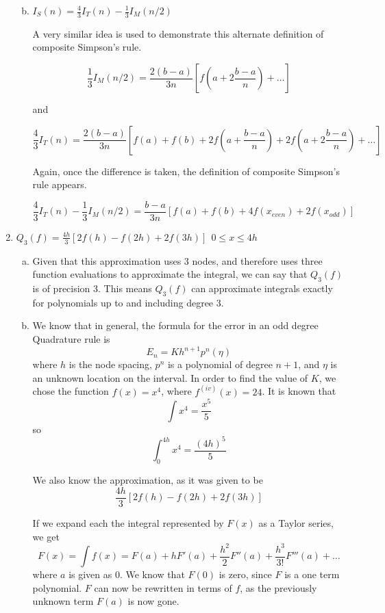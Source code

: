 \documentclass[11pt]{article}
\begin{document}
\begin{enumerate}
\begin{enumerate}[(a)]
		\medskip

		\item $I_S(n) = \frac{4}{3}I_T(n) - \frac{1}{3}I_M(n/2)$

		A very similar idea is used to demonstrate this alternate definition of composite Simpson's rule.

		\[
		\frac{1}{3}I_M(n/2) = \frac{2(b-a)}{3n}[f(a+2\frac{b-a}{n}) + \ldots]
		\]

		and

		\[
		\frac{4}{3}I_T(n) = \frac{2(b-a)}{3n}[f(a) + f(b) + 2f(a+\frac{b-a}{n}) + 2f(a+2\frac{b-a}{n}) + \ldots]
		\]

		Again, once the difference is taken, the definition of composite Simpson's rule appears.

		\[
		\frac{4}{3}I_T(n) - \frac{1}{3}I_M(n/2) = \frac{b-a}{3n}[f(a) + f(b) + 4f(x_{even}) + 2f(x_{odd})]
		\]

		\medskip

	\end{enumerate}

	\item $Q_3(f) = \frac{4h}{3}[2f(h)-f(2h)+2f(3h)]\ \ 0\leq x \leq 4h$

		\begin{enumerate}[(a)]

		\item Given that this approximation uses 3 nodes, and therefore uses three function evaluations to approximate the integral, we can say that $Q_3(f)$ is of precision $3$. This means $Q_3(f)$ can approximate integrals exactly for polynomials up to and including degree 3.

		\medskip

		\item We know that in general, the formula for the error in an odd degree Quadrature rule is
		$$E_n =  Kh^{n+1}p^n(\eta)$$
		where $h$ is the node spacing, $p^n$ is a polynomial of degree $n+1$, and $\eta$ is an unknown location on the interval. In order to find the value of $K$, we chose the function $f(x) = x^4$, where $f^{(iv)}(x) = 24$. It is known that $$\int x^4 = \frac{x^5}{5}$$ so $$\int_{0}^{4h}x^4 = \frac{(4h)^5}{5}$$

		We also know the approximation, as it was given to be
		\[
		\frac{4h}{3}[2f(h)-f(2h)+2f(3h)]
		\]

		If we expand each the integral represented by $F(x)$ as a Taylor series, we get
		\[
		F(x) = \int f(x) = F(a) + hF'(a) + \frac{h^2}{2}F''(a) + \frac{h^3}{3!}F'''(a) + \ldots
		\]
		where $a$ is given as 0. We know that $F(0)$ is zero, since $F$ is a one term polynomial. $F$ can now be rewritten in terms of $f$, as the previously unknown term $F(a)$ is now gone.


\end{enumerate}
\end{enumerate}
\end{document}
